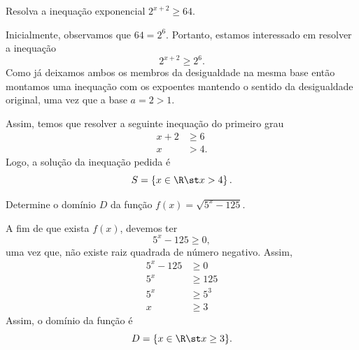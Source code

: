 \begin{example}
  Resolva a inequação exponencial \(2^{x+2} \geq 64\).

  \solution
  Inicialmente, observamos que $64=2^6$.
  Portanto, estamos interessado em resolver a inequação
  \[
    2^{x+2} \geq 2^6.
  \]
  Como já deixamos ambos os membros da desigualdade na mesma base
  então montamos uma inequação com os expoentes mantendo o sentido
  da desigualdade original, uma vez que a base $a = 2 > 1$.

  Assim, temos que resolver a seguinte inequação do primeiro grau
  \begin{align*}
    x+2 & \geq 6 \\
    x   & >    4.
  \end{align*}
  Logo, a solução da inequação pedida é
  \[
    S = \left\{ x \in \R \st x > 4 \right\}.
  \]
\end{example}

\begin{example}
  Determine o domínio $D$ da função \(f(x) = \sqrt{5^x-125}\).

  \solution
  A fim de que exista $f(x)$, devemos ter
  \[
    5^x-125 \geq 0,
  \]
  uma vez que, não existe raiz quadrada de número negativo. Assim,
  \begin{align*}
    5^x-125 & \geq 0   \\
    5^x     & \geq 125 \\
    5^x     & \geq 5^3 \\
    x       & \geq 3
  \end{align*}
  Assim, o domínio da função é
  \[
    D = \{ x \in \R \st x \geq 3 \}.
  \]
\end{example}
